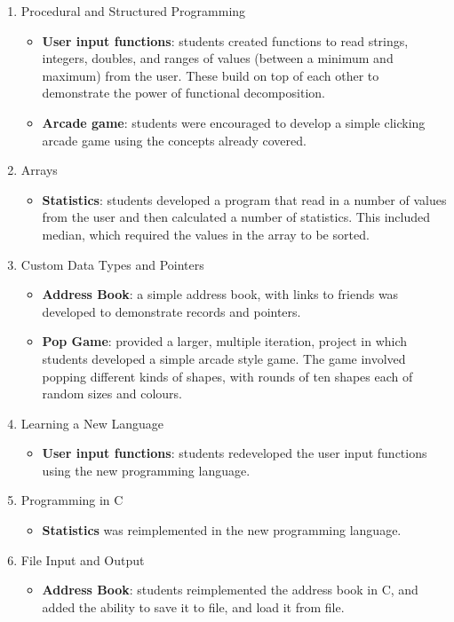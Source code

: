\begin{enumerate}
\begin{itemize}
  \end{itemize}
  \item Procedural and Structured Programming
  \begin{itemize}[noitemsep,nolistsep]
  	\item \textbf{User input functions}: students created functions to read strings, integers, doubles, and ranges of values (between a minimum and maximum) from the user. These build on top of each other to demonstrate the power of functional decomposition.
  	\item \textbf{Arcade game}: students were encouraged to develop a simple clicking arcade game using the concepts already covered.
  \end{itemize}
  \item Arrays
  \begin{itemize}[noitemsep,nolistsep]
  	\item \textbf{Statistics}: students developed a program that read in a number of values from the user and then calculated a number of statistics. This included median, which required the values in the array to be sorted.
  \end{itemize}
  \item Custom Data Types and Pointers
  \begin{itemize}[noitemsep,nolistsep]
  	\item \textbf{Address Book}: a simple address book, with links to friends was developed to demonstrate records and pointers.
  	\item \textbf{Pop Game}: provided a larger, multiple iteration, project in which students developed a simple arcade style game. The game involved popping different kinds of shapes, with rounds of ten shapes each of random sizes and colours.
  \end{itemize}
  \item Learning a New Language
  \begin{itemize}[noitemsep,nolistsep]
  	\item \textbf{User input functions}: students redeveloped the user input functions using the new programming language. 
  \end{itemize}
  \item Programming in C
  \begin{itemize}[noitemsep,nolistsep]
  	\item \textbf{Statistics} was reimplemented in the new programming language.
  \end{itemize}
  \item File Input and Output
  \begin{itemize}[noitemsep,nolistsep]
  	\item \textbf{Address Book}: students reimplemented the address book in C, and added the ability to save it to file, and load it from file. 
  \end{itemize}


\end{enumerate}
